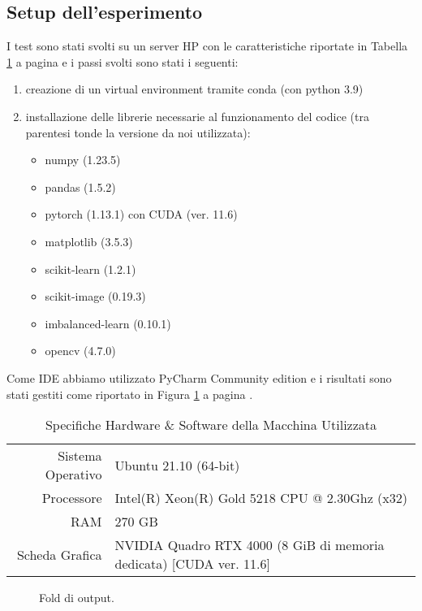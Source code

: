 \subsection{Setup dell'esperimento}
I test sono stati svolti su un server HP con le caratteristiche riportate in Tabella \ref{tab:hardware-specs}
a pagina \pageref{tab:hardware-specs} e i passi svolti sono stati i seguenti:
\begin{enumerate}
    \item creazione di un virtual environment tramite conda (con python 3.9)
    \item installazione delle librerie necessarie al funzionamento del codice 
          (tra parentesi tonde la versione da noi utilizzata):
    \begin{itemize}
        \item numpy (1.23.5)
        \item pandas (1.5.2)
        \item pytorch (1.13.1) con CUDA (ver. 11.6)
        \item matplotlib (3.5.3)
        \item scikit-learn (1.2.1)
        \item scikit-image (0.19.3)
        \item imbalanced-learn (0.10.1)
        \item opencv (4.7.0)
    \end{itemize}
\end{enumerate}
Come IDE abbiamo utilizzato PyCharm Community edition e i risultati sono stati gestiti come riportato in Figura
\ref{fig:filesystem} a pagina \pageref{fig:filesystem}.

\begin{table}[htbp!]
    \centering
        \caption{Specifiche Hardware \& Software della Macchina Utilizzata}
    \begin{tabular}{r|l}
        \toprule
         Sistema Operativo & Ubuntu 21.10 (64-bit) \\
         Processore        & Intel(R) Xeon(R) Gold 5218 CPU @ 2.30Ghz (x32) \\
         RAM               & 270 GB \\
         Scheda Grafica    & NVIDIA Quadro RTX 4000 (8 GiB di memoria dedicata) [CUDA ver. 11.6] \\
         \bottomrule
    \end{tabular}
    \label{tab:hardware-specs}
\end{table}

\begin{figure}[hbpt!]
		\centering
		
  		\caption{Fold di output.}
        \label{fig:filesystem}
\end{figure}
